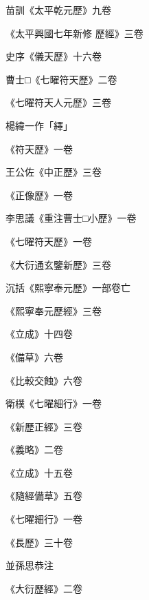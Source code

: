\begin{pinyinscope}
 苗訓《太平乾元歷》九卷



 《太平興國七年新修
 歷經》三卷



 史序《儀天歷》十六卷



 曹士□《七曜符天歷》二卷



 《七曜符天人元歷》三卷



 楊緯一作「繹」



 《符天歷》一卷



 王公佐《中正歷》三卷



 《正像歷》一卷



 李思議《重注曹士□小歷》一卷



 《七曜符天歷》一卷



 《大衍通玄鑒新歷》三卷



 沉括《熙寧奉元歷》一部卷亡



 《熙寧奉元歷經》三卷



 《立成》十四卷



 《備草》六卷



 《比較交蝕》六卷



 衛樸《七曜細行》一卷



 《新歷正經》三卷



 《義略》二卷



 《立成》十五卷



 《隨經備草》五卷



 《七曜細行》一卷



 《長歷》三十卷



 並孫思恭注



 《大衍歷經》二卷




\end{pinyinscope}
